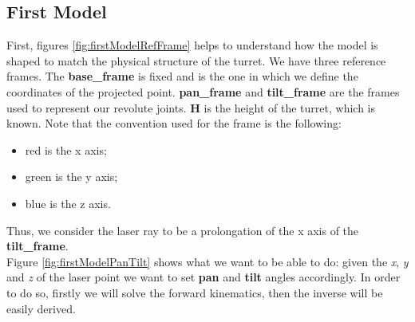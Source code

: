 \subsection{First Model}\label{subs:firstModel}
First, figures \ref{fig:firstModelRefFrame} helps to understand how the model is shaped to match the physical structure of the turret. We have three reference frames. The \textbf{base\_frame} is fixed and is the one in which we define the coordinates of the projected point. \textbf{pan\_frame} and \textbf{tilt\_frame} are the frames used to represent our revolute joints.
\textbf{H} is the height of the turret, which is known. Note that the convention used for the frame is the following:
\begin{itemize}
    \item red is the x axis;
    \item green is the y axis;
    \item blue is the z axis.
\end{itemize}
Thus, we consider the laser ray to be a prolongation of the x axis of the \textbf{tilt\_frame}. \\
Figure \ref{fig:firstModelPanTilt} shows what we want to be able to do: given the \textit{x}, \textit{y} and \textit{z} of the laser point we want to set \textbf{pan} and \textbf{tilt} angles accordingly. In order to do so, firstly we will solve the forward kinematics, then the inverse will be easily derived.
